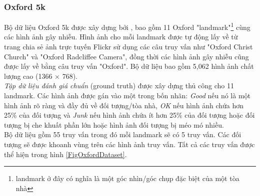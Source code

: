 \subsubsection{Oxford 5k}
Bộ dữ liệu Oxford 5k được xây dựng bởi \cite{philbin2007object}, bao gồm 11 Oxford "landmark"\footnote{landmark ở đây có nghĩa là một góc nhìn/góc chụp đặc biệt của một tòa nhà} cùng các hình ảnh gây nhiễu. Hình ảnh cho mỗi landmark được tự động lấy về từ trang chia sẻ ảnh trực tuyến Flickr sử dụng các câu truy vấn như "Oxford Christ Church" và "Oxford Radcliffee Camera", đồng thời các hình ảnh gây nhiễu cũng được lấy về bằng câu truy vấn "Oxford". Bộ dữ liệu bao gồm 5,062 hình ảnh chất lượng cao (1366 $\times$ 768).\\
\textit{Tập dữ liệu đánh giá chuẩn} (ground truth) được xây dựng thủ công cho 11 landmark. Các hình ảnh được gán vào một trong bốn nhãn: \textit{Good} nếu nó là một hình ảnh rõ ràng và đầy đủ về đối tượng/tòa nhà, \textit{OK} nếu hình ảnh chứa hơn 25\% của đối tượng và \textit{Junk} nếu hình ảnh chứa ít hơn 25\% của đối tượng hoặc đối tượng bị che khuất phần lớn hoặc hình ảnh đối tượng bị méo mó nhiều.\\
Bộ dữ liệu gồm 55 truy vấn trong đó mỗi landmark sẽ có 5 truy vấn. Các đối tượng sẽ được khoanh vùng trên các hình ảnh truy vấn. Tất cả các truy vấn được thể hiện trong hình \ref{FigOxfordDataset}.

